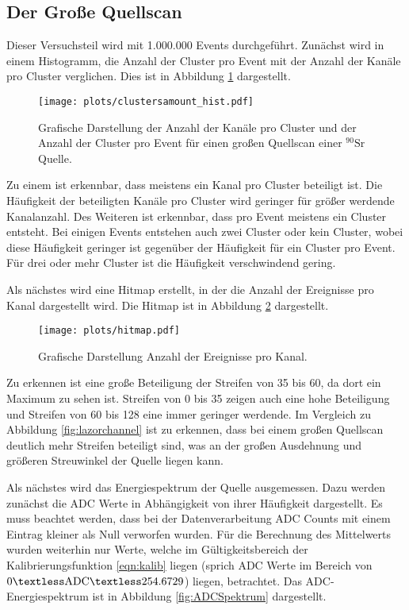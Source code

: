 \subsection{Der Große Quellscan}
\label{sec:Quellscan}

Dieser Versuchsteil wird mit 1.000.000 Events durchgeführt. Zunächst wird 
in einem Histogramm, die Anzahl der Cluster pro Event mit der Anzahl der 
Kanäle pro Cluster verglichen. Dies ist in Abbildung \ref{fig:AnzahlCluster} 
dargestellt.

\begin{figure}[H]
  \centering
  \texttt{[image: plots/clustersamount\_hist.pdf]}
  \caption{Grafische Darstellung der Anzahl der Kanäle pro Cluster und 
  der Anzahl der Cluster pro Event für einen großen Quellscan einer 
  $^{90}\text{Sr}$ Quelle.}
  \label{fig:AnzahlCluster}
\end{figure}

Zu einem ist erkennbar, dass meistens ein Kanal pro Cluster beteiligt ist. Die 
Häufigkeit der beteiligten Kanäle pro Cluster wird geringer für größer werdende 
Kanalanzahl. Des Weiteren ist erkennbar, dass pro Event meistens ein Cluster 
entsteht. Bei einigen Events entstehen auch zwei Cluster oder kein Cluster, wobei 
diese Häufigkeit geringer ist gegenüber der Häufigkeit für ein Cluster pro Event.
Für drei oder mehr Cluster ist die Häufigkeit verschwindend gering.
\par \medskip 

Als nächstes wird eine Hitmap erstellt, in der die Anzahl der Ereignisse pro 
Kanal dargestellt wird. Die Hitmap ist in Abbildung \ref{fig:Hitmap} 
dargestellt.

\begin{figure}[H]
  \centering
  \texttt{[image: plots/hitmap.pdf]}
  \caption{Grafische Darstellung Anzahl der Ereignisse pro Kanal.}
  \label{fig:Hitmap}
\end{figure}

Zu erkennen ist eine große Beteiligung der Streifen von 35 bis 60, da dort 
ein Maximum zu sehen ist. Streifen von 0 bis 35 zeigen auch eine hohe Beteiligung 
und Streifen von 60 bis 128 eine immer geringer werdende. Im Vergleich zu 
Abbildung \ref{fig:lazorchannel} ist zu erkennen, dass bei einem großen Quellscan 
deutlich mehr Streifen beteiligt sind, was an der großen Ausdehnung und größeren 
Streuwinkel der Quelle liegen kann. \par \medskip 

Als nächstes wird das Energiespektrum der Quelle ausgemessen. Dazu werden zunächst 
die ADC Werte in Abhängigkeit von ihrer Häufigkeit dargestellt. Es muss beachtet 
werden, dass bei der Datenverarbeitung ADC Counts mit einem Eintrag kleiner als Null 
verworfen wurden. Für die Berechnung des Mittelwerts wurden weiterhin nur Werte, 
welche im Gültigkeitsbereich der Kalibrierungsfunktion \eqref{eqn:kalib} liegen (sprich ADC 
Werte im Bereich von $0 \textless \text{ADC} \textless 254.6729$) liegen, 
betrachtet. Das ADC-Energiespektrum ist in Abbildung \ref{fig:ADCSpektrum} 
dargestellt. 

